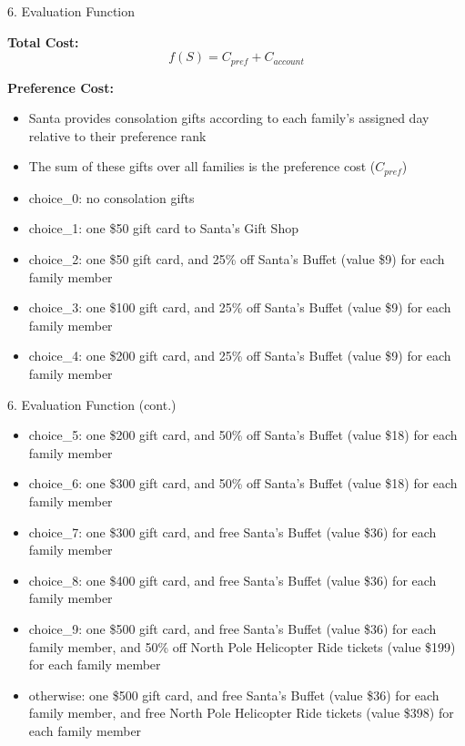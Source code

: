 \documentclass[aspectratio=169]{beamer}
\begin{document}
\begin{frame}{6. Evaluation Function}

\textbf{Total Cost:}
\[
f(S) = C_{pref} + C_{account}
\]

\vspace{0.3cm}

\textbf{Preference Cost:}
\begin{itemize}
    \item Santa provides consolation gifts according to each family's assigned day relative to their preference rank
    \item The sum of these gifts over all families is the preference cost ($C_{pref}$)
    \item choice\_0: no consolation gifts
    \item choice\_1: one \$50 gift card to Santa's Gift Shop
    \item choice\_2: one \$50 gift card, and 25\% off Santa's Buffet (value \$9) for each family member
    \item choice\_3: one \$100 gift card, and 25\% off Santa's Buffet (value \$9) for each family member
    \item choice\_4: one \$200 gift card, and 25\% off Santa's Buffet (value \$9) for each family member
\end{itemize}

\end{frame}


\begin{frame}{6. Evaluation Function (cont.)}

\begin{itemize}
    \item choice\_5: one \$200 gift card, and 50\% off Santa's Buffet (value \$18) for each family member
    \item choice\_6: one \$300 gift card, and 50\% off Santa's Buffet (value \$18) for each family member
    \item choice\_7: one \$300 gift card, and free Santa's Buffet (value \$36) for each family member
    \item choice\_8: one \$400 gift card, and free Santa's Buffet (value \$36) for each family member
    \item choice\_9: one \$500 gift card, and free Santa's Buffet (value \$36) for each family member, and 50\% off North Pole Helicopter Ride tickets (value \$199) for each family member
    \item otherwise: one \$500 gift card, and free Santa's Buffet (value \$36) for each family member, and free North Pole Helicopter Ride tickets (value \$398) for each family member
\end{itemize}

\end{frame}
\end{document}
